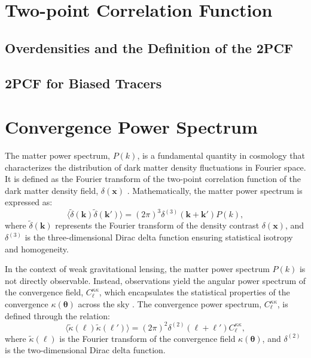 \section{Two-point Correlation Function}
\subsection{Overdensities and the Definition of the 2PCF}

\subsection{2PCF for Biased Tracers}

\section{Convergence Power Spectrum}
The matter power spectrum, \( P(k) \), is a fundamental quantity in cosmology that characterizes the distribution of dark matter density fluctuations in Fourier space. It is defined as the Fourier transform of the two-point correlation function of the dark matter density field, \( \delta(\mathbf{x}) \) \citep{2001PhR...340..291B}. Mathematically, the matter power spectrum is expressed as:
\begin{equation}
    \langle \tilde{\delta}(\mathbf{k}) \tilde{\delta}(\mathbf{k}') \rangle = (2\pi)^3 \delta^{(3)}(\mathbf{k} + \mathbf{k}') P(k),
    \label{eq:matter_power_spectrum}
\end{equation}
where \( \tilde{\delta}(\mathbf{k}) \) represents the Fourier transform of the density contrast \( \delta(\mathbf{x}) \), and \( \delta^{(3)} \) is the three-dimensional Dirac delta function ensuring statistical isotropy and homogeneity.

In the context of weak gravitational lensing, the matter power spectrum \( P(k) \) is not directly observable. Instead, observations yield the angular power spectrum of the convergence field, \( C_{\ell}^{\kappa\kappa} \), which encapsulates the statistical properties of the convergence \( \kappa(\boldsymbol{\theta}) \) across the sky \citep{2001PhR...340..291B}. The convergence power spectrum, \( C_{\ell}^{\kappa\kappa} \), is defined through the relation:
\begin{equation}
    \langle \tilde{\kappa}(\boldsymbol{\ell}) \tilde{\kappa}(\boldsymbol{\ell}') \rangle = (2\pi)^2 \delta^{(2)}(\boldsymbol{\ell} + \boldsymbol{\ell}') C^{\kappa\kappa}_\ell,
    \label{eq:convergence_power_spectrum}
\end{equation}
where \( \tilde{\kappa}(\boldsymbol{\ell}) \) is the Fourier transform of the convergence field \( \kappa(\boldsymbol{\theta}) \), and \( \delta^{(2)} \) is the two-dimensional Dirac delta function.


